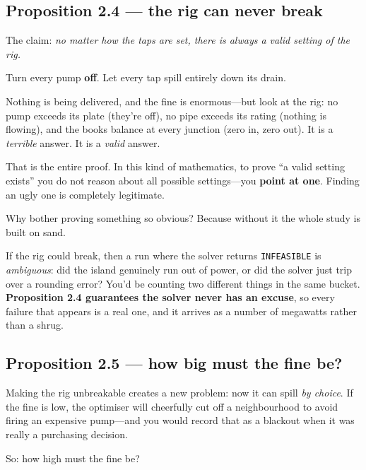 \documentclass[11pt,a4paper]{article}
\begin{document}
\subsection{Proposition 2.4 --- the rig can never break}

The claim: \emph{no matter how the taps are set, there is always a valid setting
of the rig.}

\begin{anchor}
Turn every pump \textbf{off}. Let every tap spill entirely down its drain.

Nothing is being delivered, and the fine is enormous---but look at the
rig: no pump exceeds its plate (they're off), no pipe exceeds its rating
(nothing is flowing), and the books balance at every junction (zero in, zero
out). It is a \emph{terrible} answer. It is a \emph{valid} answer.
\end{anchor}

That is the entire proof. In this kind of mathematics, to prove ``a valid
setting exists'' you do not reason about all possible settings---you
\textbf{point at one}. Finding an ugly one is completely legitimate.

\begin{watch}
Why bother proving something so obvious? Because without it the whole study is
built on sand.

If the rig could break, then a run where the solver returns
\texttt{INFEASIBLE} is \emph{ambiguous}: did the island genuinely run out of
power, or did the solver just trip over a rounding error? You'd be counting two
different things in the same bucket. \textbf{Proposition 2.4 guarantees the
solver never has an excuse}, so every failure that appears is a real one, and
it arrives as a number of megawatts rather than a shrug.
\end{watch}

\subsection{Proposition 2.5 --- how big must the fine be?}

Making the rig unbreakable creates a new problem: now it can spill \emph{by
choice}. If the fine is low, the optimiser will cheerfully cut off a
neighbourhood to avoid firing an expensive pump---and you would record that as
a blackout when it was really a purchasing decision.

So: how high must the fine be?
\end{document}

